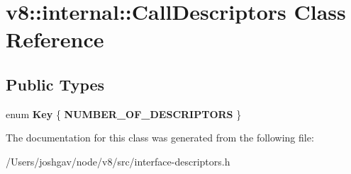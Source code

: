 \hypertarget{classv8_1_1internal_1_1_call_descriptors}{}\section{v8\+:\+:internal\+:\+:Call\+Descriptors Class Reference}
\label{classv8_1_1internal_1_1_call_descriptors}
\subsection*{Public Types}
\begin{DoxyCompactItemize}
\item 
enum {\bfseries Key} \{ {\bfseries N\+U\+M\+B\+E\+R\+\_\+\+O\+F\+\_\+\+D\+E\+S\+C\+R\+I\+P\+T\+O\+RS}
 \}\hypertarget{classv8_1_1internal_1_1_call_descriptors_afda0eda47023333e46f2900f265bff79}{}\label{classv8_1_1internal_1_1_call_descriptors_afda0eda47023333e46f2900f265bff79}

\end{DoxyCompactItemize}


The documentation for this class was generated from the following file\+:\begin{DoxyCompactItemize}
\item 
/\+Users/joshgav/node/v8/src/interface-\/descriptors.\+h\end{DoxyCompactItemize}
